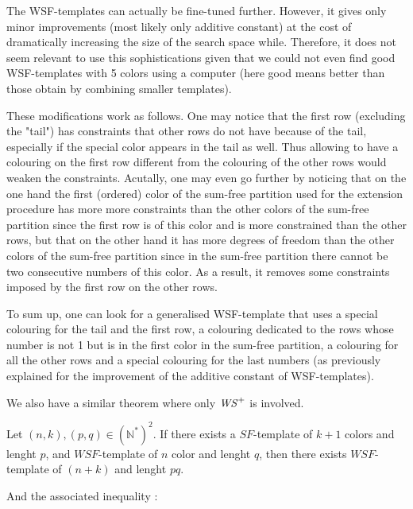 \begin{remark}
The WSF-templates can actually be fine-tuned further. However, it gives only minor improvements (most likely only additive
constant) at the cost of dramatically increasing the size of the search space while. Therefore, it does not seem relevant to
use this sophistications given that we could not even find good WSF-templates with 5 colors using a computer (here good
means better than those obtain by combining smaller templates).

\par These modifications work as follows. One may notice that the first row (excluding the "tail") has constraints that other rows
do not have because of the tail, especially if the special color appears in the tail as well. Thus allowing to have a colouring on the
first row different from the colouring of the other rows would weaken the constraints. Acutally, one may even go further by
noticing that on the one hand the first (ordered) color of the sum-free partition used for the extension procedure has more
more constraints than the other colors of the sum-free partition since the first row is of this color and is more constrained than
the other rows, but that on the other hand it has more degrees of freedom than the other colors of the sum-free partition since in
the sum-free partition there cannot be two consecutive numbers of this color. As a result, it removes  some constraints imposed
 by the first row on the other rows.

\par To sum up, one can look for a generalised WSF-template that uses a special colouring for the tail and the first row, a
colouring dedicated to the rows whose number is not 1 but is in the first color in the sum-free partition, a colouring for all
the other rows and a special colouring for the last numbers (as previously explained for the improvement of the additive
constant of WSF-templates).
\end{remark}

We also have a similar theorem where only \(\mathit{WS}^+\) is involved.

\begin{theorem}
	Let \((n,k), (p,q) \in (\mathbb{N}^*)^2\). If there exists a \(SF\)-template of \(k+1\) colors and lenght \(p\),
	and \(WSF\)-template of \(n\) color and lenght \(q\), then there exists \(WSF\)-template of \((n+k)\) and lenght \(pq\).
\end{theorem}

And the associated inequality :

